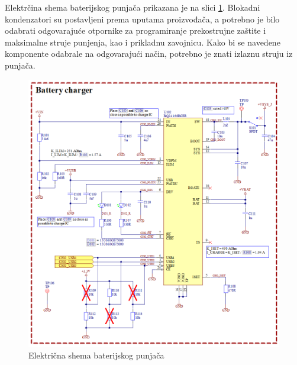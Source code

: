 Elektrčina shema baterijskog punjača prikazana je na slici \ref{slk:MB_BATCHG}. Blokadni kondenzatori su postavljeni prema uputama proizvođača, a potrebno je bilo odabrati odgovarajuće otpornike za programiranje prekostrujne zaštite i maksimalne struje punjenja, kao i prikladnu zavojnicu. Kako bi se navedene komponente odabrale na odgovarajući način, potrebno je znati izlaznu struju iz punjača.
\begin{figure}[!htb]
    \centering
    \includegraphics[width = \textwidth]{Figures/MB_BATCHG.png}
    \caption{Električna shema baterijskog punjača}
    \label{slk:MB_BATCHG}
\end{figure}

